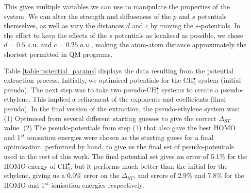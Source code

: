 \documentclass[12pt]{article}
\begin{document}
This gives multiple variables we can use to manipulate the properties of the system.
We can alter the strength and diffuseness of the \(p\) and \(s\) potentials themselves,
as well as vary the distances \(d\) and \(c\) by moving the \(s\)-potentials.
In the effort to keep the effects 
of the $s$ potentials as localised as possible, we chose $d=0.5$ a.u. and \(c = 0.25\;a.u.\), making the atom-atom distance approximately the shortest permitted in QM programs.

Table \ref{table:potential_params} displays the data resulting from the potential extraction process. 
Initially, we optimised potentials for the CH$_3^\bullet$ system (initial pseudo).
The next step was to take two pseudo-CH\(^{\bullet}_{3}\) systems to create a pseudo-ethylene. 
This implied a refinement of the exponents and coefficients (final pseudo).
In the final version of the extraction, the pseudo-ethylene system was: (1) Optimised from several different starting guesses to give the correct $\Delta_{ST}$ value. (2) The pseudo-potentials from step (1) that also gave the best HOMO and 1$^{st}$ ionisation energies were chosen as the starting guess for a final optimisation, performed by hand, to give us the final set of pseudo-potentials used in the rest of this work.
The final potential set gives an error of 5.1\% for the HOMO energy of CH\(^{\bullet}_{3}\), but it
performs much better than the initial for the ethylene,
giving us a 0.0\% error on the $\Delta_{ST}$, and errors of 2.9\% and 7.8\% for the HOMO and 1$^{st}$ ionisation energies respectively.
\end{document}
